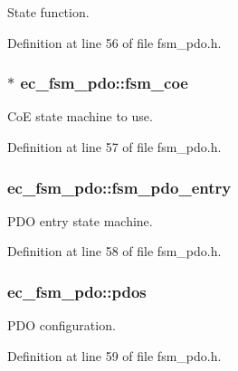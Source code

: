 \-State function. 



\-Definition at line 56 of file fsm\-\_\-pdo.\-h.

\subsubsection[{fsm\-\_\-coe}]{$\ast$ {\bf ec\-\_\-fsm\-\_\-pdo\-::fsm\-\_\-coe}}\label{structec__fsm__pdo_af81a92fdb4a376a02c5f0a1cf60917b4}


\-Co\-E state machine to use. 



\-Definition at line 57 of file fsm\-\_\-pdo.\-h.

\subsubsection[{fsm\-\_\-pdo\-\_\-entry}]{ {\bf ec\-\_\-fsm\-\_\-pdo\-::fsm\-\_\-pdo\-\_\-entry}}\label{structec__fsm__pdo_aee68eda7245e56950c5409bf92c36c7d}


\-P\-D\-O entry state machine. 



\-Definition at line 58 of file fsm\-\_\-pdo.\-h.

\subsubsection[{pdos}]{ {\bf ec\-\_\-fsm\-\_\-pdo\-::pdos}}\label{structec__fsm__pdo_ac1519353602acca12353ea0719a6ba85}


\-P\-D\-O configuration. 



\-Definition at line 59 of file fsm\-\_\-pdo.\-h.

